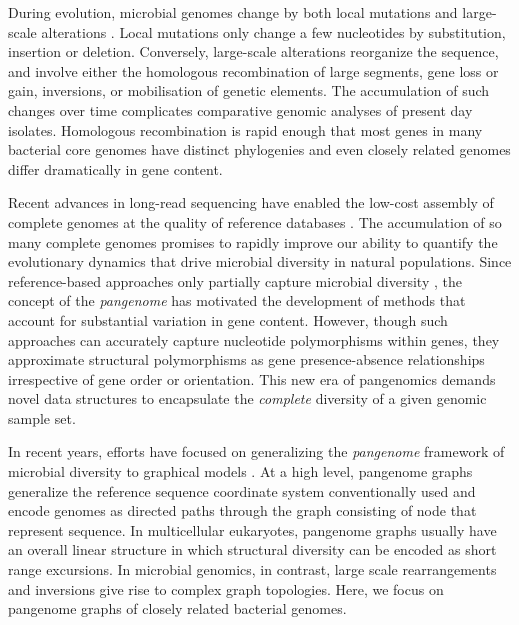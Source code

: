 \documentclass[aps,rmp,reprint,superscriptaddress,notitlepage,10pt]{revtex4-1}
\begin{document}
During evolution, microbial genomes change by both local mutations and large-scale alterations \cite{arnold2021horizontal}.
Local mutations only change a few nucleotides by substitution, insertion or deletion.
Conversely, large-scale alterations reorganize the sequence, and involve either the homologous recombination of large segments, gene loss or gain, inversions, or mobilisation of genetic elements.
The accumulation of such changes over time complicates comparative genomic analyses of present day isolates.
Homologous recombination is rapid enough that most genes in many bacterial core genomes have distinct phylogenies \cite{sakoparnig2021whole} and even closely related genomes differ dramatically in gene content.

Recent advances in long-read sequencing have enabled the low-cost assembly of complete genomes at the quality of reference databases \cite{whibley2021changing}.
The accumulation of so many complete genomes promises to rapidly improve our ability to quantify the evolutionary dynamics that drive microbial diversity in natural populations.
Since reference-based approaches only partially capture microbial diversity \cite{tettelin2008comparative}, the concept of the \emph{pangenome} has motivated the development of methods that account for substantial variation in gene content.
However, though such approaches can accurately capture nucleotide polymorphisms within genes, they approximate structural polymorphisms as gene presence-absence relationships \cite{page2015roary,ding2018panx} irrespective of gene order or orientation.
This new era of pangenomics demands novel data structures to encapsulate the \emph{complete} diversity of a given genomic sample set.

In recent years, efforts have focused on generalizing the \emph{pangenome} framework of microbial diversity to graphical models \cite{eizenga2020pangenome}.
At a high level, pangenome graphs generalize the reference sequence coordinate system conventionally used and encode genomes as directed paths through the graph consisting of node that represent sequence.
In multicellular eukaryotes, pangenome graphs usually have an overall linear structure in which structural diversity can be encoded as short range  excursions.
In microbial genomics, in contrast, large scale rearrangements and inversions give rise to complex graph topologies.
Here, we focus on pangenome graphs of closely related bacterial genomes.
\end{document}
